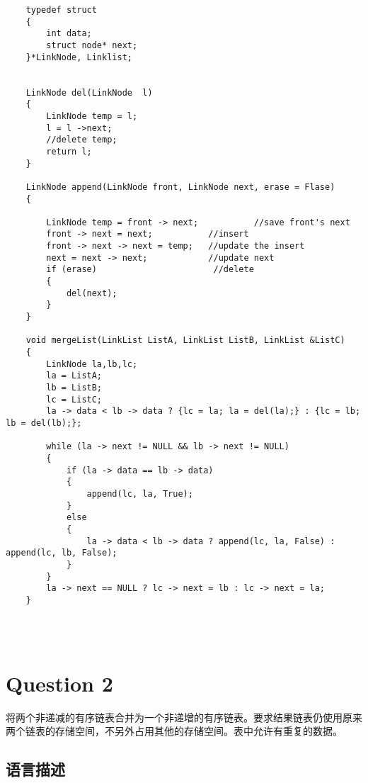 \documentclass{article}
\begin{document}
\begin{verbatim}
    typedef struct
    {
        int data;
        struct node* next;
    }*LinkNode, Linklist;


    LinkNode del(LinkNode  l)
    {
        LinkNode temp = l;
        l = l ->next;
        //delete temp;
        return l;
    }

    LinkNode append(LinkNode front, LinkNode next, erase = Flase)
    {	
    
        LinkNode temp = front -> next;           //save front's next
        front -> next = next;           //insert
        front -> next -> next = temp;   //update the insert
        next = next -> next;            //update next
        if (erase)                       //delete
        {
            del(next);
        }
    }

    void mergeList(LinkList ListA, LinkList ListB, LinkList &ListC)
    {
        LinkNode la,lb,lc;
        la = ListA;
        lb = ListB;
        lc = ListC;
        la -> data < lb -> data ? {lc = la; la = del(la);} : {lc = lb; lb = del(lb);};

        while (la -> next != NULL && lb -> next != NULL)
        {
            if (la -> data == lb -> data)
            {
                append(lc, la, True);
            }
            else
            {
                la -> data < lb -> data ? append(lc, la, False) : append(lc, lb, False);
            }
        }
        la -> next == NULL ? lc -> next = lb : lc -> next = la;
    }




\end{verbatim}










\section{Question 2} 

将两个非递减的有序链表合并为一个非递增的有序链表。要求结果链表仍使用原来两个链表的存储空间，不另外占用其他的存储空间。表中允许有重复的数据。


\subsection{语言描述} 
\end{document}
